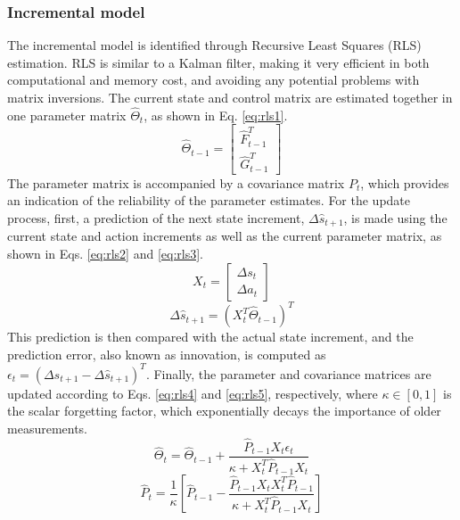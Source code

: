 \subsubsection{Incremental model}
The incremental model is identified through Recursive Least Squares (RLS) estimation. RLS is similar to a Kalman filter, making it very efficient in both computational and memory cost, and avoiding any potential problems with matrix inversions. The current state and control matrix are estimated together in one parameter matrix $\hat{\Theta}_t$, as shown in Eq. \eqref{eq:rls1}. 
\begin{equation} \label{eq:rls1}
    \hat{\Theta}_{t-1} = \begin{bmatrix} \hat{F}^T_{t-1} \\ \hat{G}^T_{t-1}\end{bmatrix}
\end{equation}
The parameter matrix is accompanied by a covariance matrix $P_t$, which provides an indication of the reliability of the parameter estimates. For the update process, first, a prediction of the next state increment, $\Delta \hat{s}_{t+1}$, is made using the current state and action increments as well as the current parameter matrix, as shown in Eqs. \eqref{eq:rls2} and \eqref{eq:rls3}. 
\begin{equation} \label{eq:rls2}
    X_t = \begin{bmatrix} \Delta s_t \\ \Delta a_t \end{bmatrix}
\end{equation}
\begin{equation} \label{eq:rls3}
    \Delta \hat{s}_{t+1} = \left(X_t^T \hat{\Theta}_{t-1}\right)^T
\end{equation}
This prediction is then compared with the actual state increment, and the prediction error, also known as innovation, is computed as $\epsilon_t = (\Delta s_{t+1} - \Delta \hat{s}_{t+1})^T$. Finally, the parameter and covariance matrices are updated according to Eqs. \eqref{eq:rls4} and \eqref{eq:rls5}, respectively, where $\kappa \in [0,1]$ is the scalar forgetting factor, which exponentially decays the importance of older measurements. 
\begin{equation} \label{eq:rls4}
    \hat{\Theta}_{t} = \hat{\Theta}_{t-1} + \frac{\hat{P}_{t-1} X_t \epsilon_t}{\kappa + X_t^T \hat{P}_{t-1} X_t}
\end{equation} 
\begin{equation} \label{eq:rls5}
    \hat{P}_t = \frac{1}{\kappa}\left[\hat{P}_{t-1} - \frac{\hat{P}_{t-1} X_t X_t^T \hat{P}_{t-1}}{\kappa + X_t^T \hat{P}_{t-1} X_t}\right]
\end{equation}


